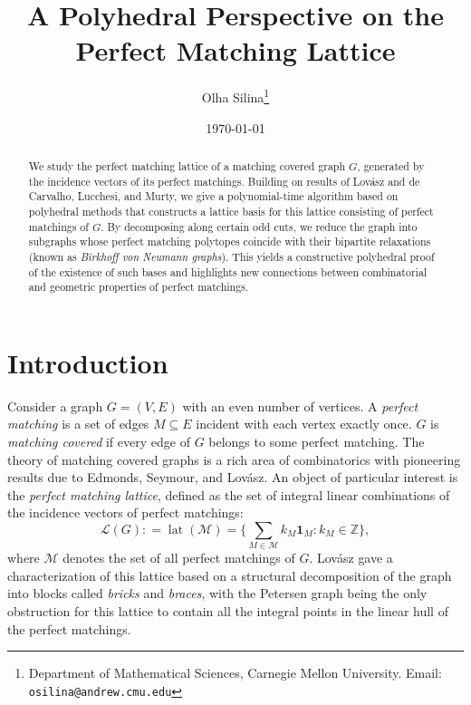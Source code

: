 \documentclass[11pt]{article}
\title{A Polyhedral Perspective on the Perfect Matching Lattice}
\author{Olha Silina\thanks{Department of Mathematical Sciences, Carnegie Mellon University. 
Email: \texttt{osilina@andrew.cmu.edu}}}
\date{\today}
\DeclareMathOperator{\lat}{lat}
\newcommand{\1}{\mathbf{1}}
\newcommand{\0}{\mathbf{0}}
\newcommand{\zL}{\mathcal L}
\newcommand{\Z}{\mathbb{Z}}
\begin{document}
\maketitle

\begin{abstract}
    We study the perfect matching lattice of a matching covered graph $G$, generated by the incidence vectors of its perfect matchings. Building on results of Lov\'asz and de Carvalho, Lucchesi, and Murty, we give a polynomial-time algorithm based on polyhedral methods that constructs a lattice basis for this lattice consisting of perfect matchings of $G$. By decomposing along certain odd cuts, we reduce the graph into subgraphs whose perfect matching polytopes coincide with their bipartite relaxations (known as \emph{Birkhoff von Neumann graphs}). This yields a constructive polyhedral proof of the existence of such bases and highlights new connections between combinatorial and geometric properties of perfect matchings.
\end{abstract}

\section{Introduction}


Consider a graph $G=(V,E)$ with an even number of vertices. A \emph{perfect matching} is a set of edges $M\subseteq E$ incident with each vertex exactly once. $G$ is \emph{matching covered} if every edge of $G$ belongs to some perfect matching.
The theory of matching covered graphs is a rich area of combinatorics with pioneering results due to Edmonds, Seymour, and Lov\'asz. An object of particular interest is the \emph{perfect matching lattice}, defined as the set of integral linear combinations of the incidence vectors of perfect matchings: \begin{equation*}
    \zL(G): = \lat(\mathcal{M})= \{\sum_{M \in \mathcal{M}}k_M \mathbf{1}_M: k_M \in \Z\},
\end{equation*} where $\mathcal{M}$ denotes the set of all perfect matchings of $G$.
Lov\'asz \cite{lovaszPM} gave a characterization of this lattice based on a structural decomposition of the graph into blocks called \emph{bricks} and \emph{braces}, with the Petersen graph being the only obstruction for this lattice to contain all the integral points in the linear hull of the perfect matchings. %
\end{document}
